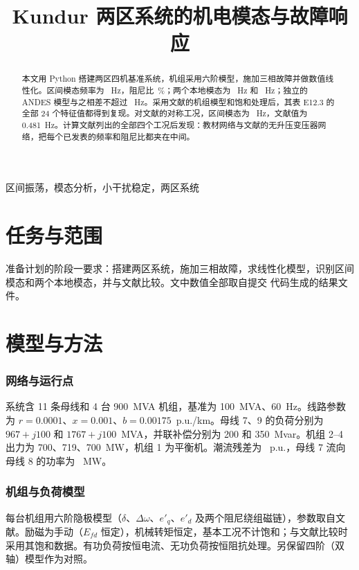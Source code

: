 \documentclass[conference,letterpaper]{IEEEtran}
\begin{document}
\title{Kundur 两区系统的机电模态与故障响应}
\author{
}
\maketitle

\begin{abstract}
本文用 Python 搭建两区四机基准系统，机组采用六阶模型，施加三相故障并做数值线性化。区间模态频率为 \VfIA~Hz，阻尼比 \VzIA\,\%；两个本地模态为 \VfLA~Hz 和 \VfLB~Hz；独立的 ANDES 模型与之相差不超过 \Vandesdf~Hz。采用文献\cite{kundur}的机组模型和饱和处理后，其表 E12.3 的全部 24 个特征值都得到复现。对文献\cite{klein}的对称工况，区间模态为 \Vfsym~Hz，文献值为 0.481~Hz。计算文献\cite{klein}列出的全部四个工况后发现：教材网络与文献\cite{klein}的无升压变压器网络，把每个已发表的频率和阻尼比都夹在中间。
\end{abstract}
\begin{IEEEkeywords}
区间振荡，模态分析，小干扰稳定，两区系统
\end{IEEEkeywords}

\section{任务与范围}
准备计划的阶段一要求：搭建两区系统\cite{kundur,klein}，施加三相故障，求线性化模型，识别区间模态和两个本地模态，并与文献\cite{klein}比较。文中数值全部取自提交 \texttt{\Vcommit} 代码生成的结果文件。

\section{模型与方法}
\subsubsection*{网络与运行点}
系统含 11 条母线和 4 台 900~MVA 机组，基准为 100~MVA、60~Hz。线路参数为 $r=0.0001$、$x=0.001$、$b=0.00175$~p.u./km。母线 7、9 的负荷分别为 $967+j100$ 和 $1767+j100$~MVA，并联补偿分别为 200 和 350~Mvar。机组 2--4 出力为 700、719、700~MW，机组 1 为平衡机。潮流残差为 \Vpfres~p.u.，母线 7 流向母线 8 的功率为 \Vtie~MW。

\subsubsection*{机组与负荷模型}
每台机组用六阶隐极模型（$\delta$、$\Delta\omega$、$e'_q$、$e'_d$ 及两个阻尼绕组磁链），参数取自文献\cite{kundur}。励磁为手动（$E_{fd}$ 恒定），机械转矩恒定，基本工况不计饱和；与文献\cite{kundur}比较时采用其饱和数据。有功负荷按恒电流、无功负荷按恒阻抗处理。另保留四阶（双轴）模型作为对照。
\end{document}
